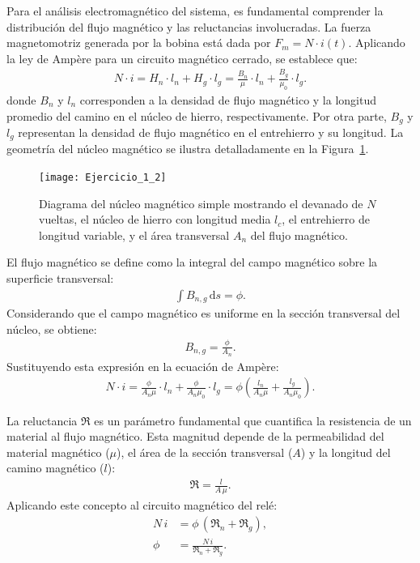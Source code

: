 \documentclass[
  11pt,
  letterpaper,
   addpoints,
  ]{exam}
\newcommand{\Rel}{\mathfrak{R}} %
\begin{document}
Para el análisis electromagnético del sistema, es fundamental comprender la distribución del flujo magnético y las reluctancias involucradas. La fuerza magnetomotriz generada por la bobina está dada por $F_m = N \cdot i(t)$. Aplicando la ley de Ampère para un circuito magnético cerrado, se establece que:
\begin{align}
  N \cdot i = H_n \cdot l_n + H_g \cdot l_g  = \frac{B_n}{\mu} \cdot l_n + \frac{B_g}{\mu_0} \cdot l_g .
\end{align}
donde $B_n$ y $l_n$ corresponden a la densidad de flujo magnético y la longitud promedio del camino en el núcleo de hierro, respectivamente. Por otra parte, $B_g$ y $l_g$ representan la densidad de flujo magnético en el entrehierro y su longitud. La geometría del núcleo magnético se ilustra detalladamente en la Figura~\ref{fig:core}.

\begin{figure}[h!]
  \centering
  \texttt{[image: Ejercicio\_1\_2]}
  \caption{Diagrama del núcleo magnético simple mostrando el devanado de $N$ vueltas, el núcleo de hierro con longitud media $l_c$, el entrehierro de longitud variable, y el área transversal $A_n$ del flujo magnético.}
  \label{fig:core}
\end{figure}

El flujo magnético se define como la integral del campo magnético sobre la superficie transversal:
\begin{align}
  \int B_{n,g}\, \mathrm{d}s = \phi.
\end{align}
Considerando que el campo magnético es uniforme en la sección transversal del núcleo, se obtiene:
\begin{align}
  B_{n,g} = \frac{\phi}{A_n}.
\end{align}
Sustituyendo esta expresión en la ecuación de Ampère:
\begin{align}
  N \cdot i = \frac{\phi}{A_n \mu} \cdot l_n + \frac{\phi}{A_n \mu_0} \cdot l_g = \phi\!\left(\frac{l_n}{A_n \mu} + \frac{l_g}{A_n \mu_0}\right).
\end{align}

La reluctancia $\Rel$ es un parámetro fundamental que cuantifica la resistencia de un material al flujo magnético. Esta magnitud depende de la permeabilidad del material magnético ($\mu$), el área de la sección transversal ($A$) y la longitud del camino magnético ($l$):
\begin{align}
  \Rel = \frac{l}{A\,\mu}.
\end{align}
Aplicando este concepto al circuito magnético del relé:
\begin{align}
  N\,i &= \phi\,(\Rel_n + \Rel_g), \\
  \phi &= \frac{N\,i}{\Rel_n + \Rel_g}.
\end{align}
\end{document}
